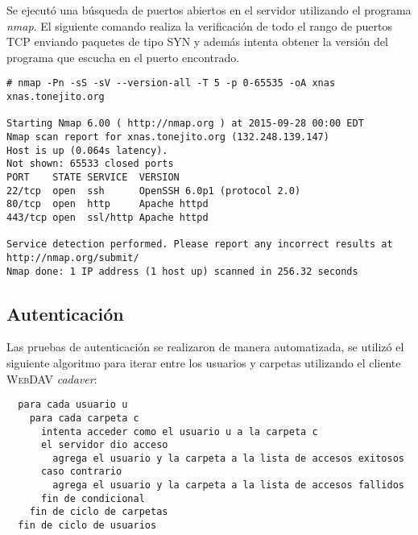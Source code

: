 Se ejecut\'{o} una b\'{u}squeda de puertos abiertos en el servidor utilizando el programa \emph{nmap}. El siguiente comando realiza la verificaci\'{o}n de todo el rango de puertos \textsc{TCP} enviando paquetes de tipo \textsc{SYN} y adem\'{a}s intenta obtener la versi\'{o}n del programa que escucha en el puerto encontrado.


{
\scriptsize
\linespread{1}
\begin{verbatim}
# nmap -Pn -sS -sV --version-all -T 5 -p 0-65535 -oA xnas xnas.tonejito.org

Starting Nmap 6.00 ( http://nmap.org ) at 2015-09-28 00:00 EDT
Nmap scan report for xnas.tonejito.org (132.248.139.147)
Host is up (0.064s latency).
Not shown: 65533 closed ports
PORT    STATE SERVICE  VERSION
22/tcp  open  ssh      OpenSSH 6.0p1 (protocol 2.0)
80/tcp  open  http     Apache httpd
443/tcp open  ssl/http Apache httpd

Service detection performed. Please report any incorrect results at http://nmap.org/submit/
Nmap done: 1 IP address (1 host up) scanned in 256.32 seconds
\end{verbatim}
}


      \subsection {Autenticaci\'{o}n}

Las pruebas de autenticaci\'{o}n se realizaron de manera automatizada, se utiliz\'{o} el siguiente algoritmo para iterar entre los usuarios y carpetas utilizando el cliente \textsc{\gls{WebDAV}} \textsl{cadaver}:

{
\scriptsize
\linespread{1}
\begin{verbatim}
  para cada usuario u
    para cada carpeta c
      intenta acceder como el usuario u a la carpeta c
      el servidor dio acceso
        agrega el usuario y la carpeta a la lista de accesos exitosos
      caso contrario
        agrega el usuario y la carpeta a la lista de accesos fallidos
      fin de condicional
    fin de ciclo de carpetas
  fin de ciclo de usuarios
\end{verbatim}
}

